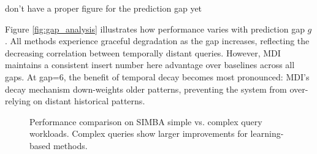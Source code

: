 \documentclass[sigconf, nonacm]{acmart}
\begin{document}
don't have a proper figure for the prediction gap yet

Figure \ref{fig:gap_analysis} illustrates how performance varies with prediction gap $g$. All methods experience graceful degradation as the gap increases, reflecting the decreasing correlation between temporally distant queries. However, MDI maintains a consistent {insert number here} advantage over baselines across all gaps. At gap=6, the benefit of temporal decay becomes most pronounced: MDI's decay mechanism down-weights older patterns, preventing the system from over-relying on distant historical patterns.




\begin{table}[t]
\centering
\caption{Ablation study: contribution of MDI components (SDSS, gap=1, k=10)}
\end{table}


\begin{figure}[t]
\centering
\caption{Performance comparison on SIMBA simple vs. complex query workloads. Complex queries show larger improvements for learning-based methods.}
\label{fig:simba_comparison}
\end{figure}
\end{document}
